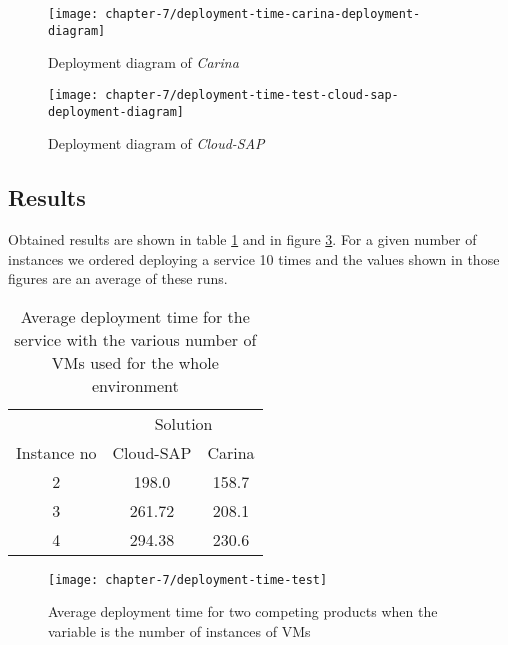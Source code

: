 \begin{figure}[!ht]
  \begin{center}
    \texttt{[image: chapter-7/deployment-time-carina-deployment-diagram]}
  \end{center}
  \caption{Deployment diagram of \emph{Carina}}
  \label{ch7:deployment-time-test-deployment-time-carina-deployment-diagram}
\end{figure}

\begin{figure}[!ht]
  \begin{center}
    \texttt{[image: chapter-7/deployment-time-test-cloud-sap-deployment-diagram]}
  \end{center}
  \caption{Deployment diagram of \emph{Cloud-SAP}}
  \label{ch7:deployment-time-test-cloud-sap-deployment-diagram}
\end{figure}

\subsection*{Results}
Obtained results are shown in table \ref{tbl:test-service-deployment-time} and in figure \ref{ch7:deployment-time-test}. For a given number of instances we ordered deploying a service 10 times and the values shown in those figures are an average of these runs.

\begin{table}
  \centering
  \begin{tabular}{ c  c  c }
    \hline
    & \multicolumn{2}{c}{Solution} \\
    \cline{2-3}
    Instance no & Cloud-SAP & Carina \\
    \hline
    2 & 198.0 & 158.7 \\
    3 & 261.72 & 208.1 \\
    4 & 294.38 & 230.6 \\
    \hline
  \end{tabular}
  \caption{Average deployment time for the service with the various number of VMs used for the whole environment}
  \label{tbl:test-service-deployment-time}
\end{table}

\begin{figure}[!ht]
  \begin{center}
    \texttt{[image: chapter-7/deployment-time-test]}
  \end{center}
  \caption{Average deployment time for two competing products when the variable is the number of instances of VMs}
  \label{ch7:deployment-time-test}
\end{figure}

